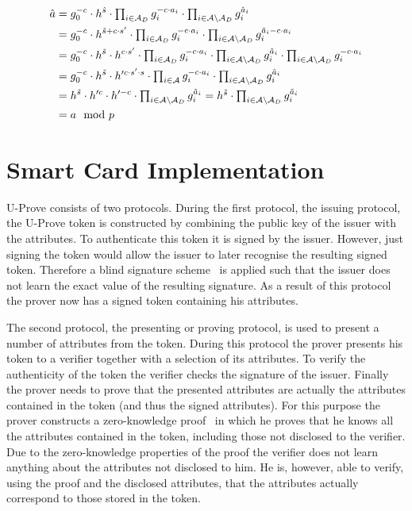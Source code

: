 \begin{align*}
  \hat{a}
  & = g_0^{-c} \cdot h^{\hat{s}}
    \cdot \textstyle\prod_{i \in \mathcal{A}_D} g_i^{-c \cdot a_i}
    \cdot \textstyle\prod_{i \in \mathcal{A} \setminus \mathcal{A}_D} g_i^{\hat{a}_i} \\
  & = g_0^{-c} \cdot h^{\tilde{s} + c \cdot s'}
    \cdot \textstyle\prod_{i \in \mathcal{A}_D} g_i^{-c \cdot a_i}
    \cdot \textstyle\prod_{i \in \mathcal{A} \setminus \mathcal{A}_D} g_i^{\tilde{a}_i - c \cdot a_i} \\
  & = g_0^{-c} \cdot h^{\tilde{s}} \cdot h^{c \cdot s'}
    \cdot \textstyle\prod_{i \in \mathcal{A}_D} g_i^{-c \cdot a_i}
    \cdot \textstyle\prod_{i \in \mathcal{A} \setminus \mathcal{A}_D} g_i^{\tilde{a}_i}
    \cdot \textstyle\prod_{i \in \mathcal{A} \setminus \mathcal{A}_D} g_i^{- c \cdot a_i} \\
  & = g_0^{-c} \cdot h^{\tilde{s}} \cdot h'^{c \cdot s' \cdot s}
    \cdot \textstyle\prod_{i \in \mathcal{A}} g_i^{-c \cdot a_i}
    \cdot \textstyle\prod_{i \in \mathcal{A} \setminus \mathcal{A}_D} g_i^{\tilde{a}_i} \\
  & = h^{\tilde{s}} \cdot h'^{c} \cdot h'^{-c}
    \cdot \textstyle\prod_{i \in \mathcal{A} \setminus \mathcal{A}_D} g_i^{\tilde{a}_i}
  = h^{\tilde{s}}
    \cdot \textstyle\prod_{i \in \mathcal{A} \setminus \mathcal{A}_D} g_i^{\tilde{a}_i} \\
  & = a \mod p
\end{align*}


\section{Smart Card Implementation}

U-Prove consists of two protocols. During the first protocol, the issuing protocol, the U-Prove token is
constructed by combining the public key of the issuer with the attributes. To
authenticate this token it is signed by the issuer. However, just signing the
token would allow the issuer to later recognise the resulting signed token.
Therefore a blind signature scheme~\cite{Chaum1983} is applied such that the
issuer does not learn the exact value of the resulting signature. As a result of
this protocol the prover now has a signed token containing his attributes.

The second protocol, the presenting or proving protocol, is used to present a
number of attributes from the token. During this protocol the prover presents
his token to a verifier together with a selection of its attributes. To verify
the authenticity of the token the verifier checks the signature of the issuer.
Finally the prover needs to prove that the presented attributes are actually the
attributes contained in the token (and thus the signed attributes). For this
purpose the prover constructs a zero-knowledge proof~\cite{FiatShamir1987} in
which he proves that he knows all the attributes contained in the token,
including those not disclosed to the verifier. Due to the zero-knowledge
properties of the proof the verifier does not learn anything about the
attributes not disclosed to him. He is, however, able to verify, using the proof
and the disclosed attributes, that the attributes actually correspond to those
stored in the token.

